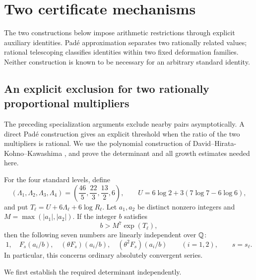\section{Two certificate mechanisms}
\label{rev:certificate-mechanisms}

The two constructions below impose arithmetic restrictions through
explicit auxiliary identities. Pad\'e approximation separates two
rationally related values; rational telescoping classifies identities
within two fixed deformation families. Neither construction is known
to be necessary for an arbitrary standard identity.

\subsection{An explicit exclusion for two rationally proportional multipliers}

The preceding specialization arguments exclude nearby pairs
asymptotically.  A direct Pad\'e construction gives an explicit threshold
when the ratio of the two multipliers is rational.  We use the polynomial
construction of David--Hirata-Kohno--Kawashima
\cite[Proposition~3.6]{DHK2022}, and prove the determinant and all
growth estimates needed here.

\begin{theorem}
\label{thm:C-pade-explicit}
For the four standard levels, define
\[
 (\Lambda_1,\Lambda_2,\Lambda_3,\Lambda_4)
   =\left(\frac{46}{5},\frac{22}{3},\frac{13}{2},6\right),
 \qquad U=6\log2+3(7\log7-6\log6),
\]
and put $T_\ell=U+6\Lambda_\ell+6\log R_\ell$.
Let $a_1,a_2$ be distinct nonzero integers and
$M=\max(|a_1|,|a_2|)$.  If the integer $b$ satisfies
\begin{equation}\label{eq:C-pade-threshold}
 b>M^7\exp(T_\ell),
\end{equation}
then the following seven numbers are linearly independent over $\mathbb Q$:
\[
 1,\quad F_s(a_i/b),\quad
 (\theta F_s)(a_i/b),\quad(\theta^2F_s)(a_i/b)
 \qquad(i=1,2),\qquad s=s_\ell.
\]
In particular, this concerns ordinary absolutely convergent series.
\end{theorem}

We first establish the required determinant independently.


